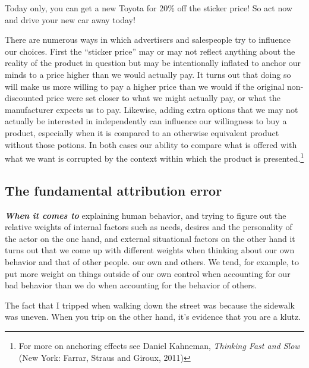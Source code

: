 \documentclass[
  12pt, openany]{book}
\begin{document}
\begin{center}

\begin{argument}

Today only, you can get a new Toyota for 20\% off the sticker price! So act now and drive your new car away today!

\end{argument}

\end{center}

There are numerous ways in which advertisers and salespeople try to influence our choices. First the ``sticker price'' may or may not reflect anything about the reality of the product in question but may be intentionally inflated to anchor our minds to a price higher than we would actually pay. It turns out that doing so will make us more willing to pay a higher price than we would if the original non-discounted price were set closer to what we might actually pay, or what the manufacturer expects us to pay. Likewise, adding extra options that we may not actually be interested in independently can influence our willingness to buy a product, especially when it is compared to an otherwise equivalent product without those potions. In both cases our ability to compare what is offered with what we want is corrupted by the context within which the product is presented.\footnote{For more on anchoring effects see Daniel Kahneman, \emph{Thinking Fast and Slow} (New York: Farrar, Straus and Giroux, 2011)}

\hypertarget{the-fundamental-attribution-error}{%
\subsection*{The fundamental attribution error}\label{the-fundamental-attribution-error}}


\textbf{\emph{When it comes to}} explaining human behavior, and trying to figure out the relative weights of internal factors such as needs, desires and the personality of the actor on the one hand, and external situational factors on the other hand it turns out that we come up with different weights when thinking about our own behavior and that of other people. our own and others. We tend, for example, to put more weight on things outside of our own control when accounting for our bad behavior than we do when accounting for the behavior of others.

\begin{center}

\begin{argument}

The fact that I tripped when walking down the street was because the sidewalk was uneven. When you trip on the other hand, it's evidence that you are a klutz.

\end{argument}

\end{center}
\end{document}
